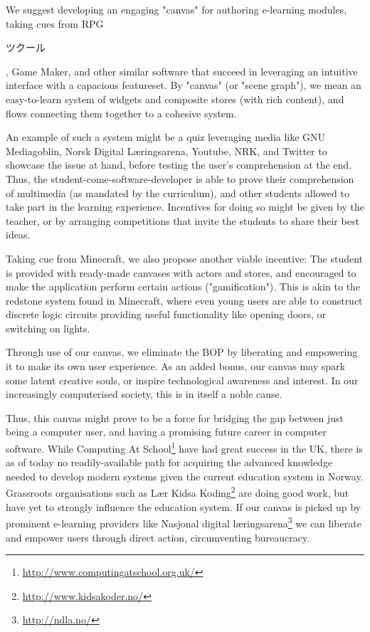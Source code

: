We suggest developing an engaging "canvas"  for authoring e-learning modules, 
taking cues from RPG\begin{CJK}{UTF8}{min}ツクール\end{CJK}, Game Maker, and 
other similar software that succeed in leveraging an intuitive interface with 
a capacious featureset. By "canvas" (or "scene graph"), we mean an 
easy-to-learn system of widgets and composite stores (with rich content), and 
flows connecting them together to a cohesive system. 

An example of such a system might be a quiz leveraging media like GNU 
Mediagoblin, Norsk Digital Læringsarena, Youtube, NRK, and Twitter to showcase 
the issue at hand, before testing the user's comprehension at the end. Thus, 
the student-come-software-developer is able to prove their comprehension of 
multimedia (as mandated by the curriculum), and other students allowed to take 
part in the learning experience. Incentives for doing so might be given by the 
teacher, or by arranging competitions that invite the students to share their 
best ideas.

Taking cue from Minecraft, we also propose another viable incentive: The 
student is provided with ready-made canvases with actors and stores, and 
encouraged to make the application perform certain actions ("gamification"). 
This is akin to the redstone system found in Minecraft, where even young users 
are able to construct discrete logic circuits providing useful functionality 
like opening doors, or switching on lights.

Through use of our canvas, we eliminate the BOP by liberating and empowering 
it to make its own user experience. As an added bonus, our canvas may spark 
some latent creative souls, or inspire technological awareness and interest. 
In our increasingly computerised society, this is in itself a noble cause. 

Thus, this canvas might prove to be a force for bridging the gap between just 
being a computer user, and having a promising future career in computer 
software. While Computing At 
School\footnote{\url{http://www.computingatschool.org.uk/}} have had great 
success in the UK, there is as of today no readily-available path for 
acquiring the advanced knowledge needed to develop modern systems given the 
current education system in Norway. Grassroots organisations such as Lær Kidsa 
Koding\footnote{\url{http://www.kidsakoder.no/}} are doing good work, but have 
yet to strongly influence the education system. If our canvas is picked up by 
prominent e-learning providers like Nasjonal digital 
læringsarena\footnote{\url{http://ndla.no/}} we can liberate and empower users 
through direct action, circumventing bureaucracy.

